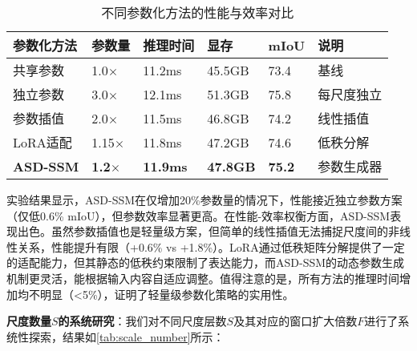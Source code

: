 \documentclass[preprint,12pt]{elsarticle}
\begin{document}
\begin{table}[htbp!]
	\centering
	\caption{不同参数化方法的性能与效率对比}
	\label{tab:parameterization_comparison}
	\begin{tabular}{@{}llllll@{}}
		\toprule
		参数化方法 & 参数量 & 推理时间 & 显存 & mIoU & 说明 \\ 
		\midrule
		共享参数 & 1.0$\times$ & 11.2ms & 45.5GB & 73.4 & 基线 \\
		\midrule
		独立参数 & 3.0$\times$ & 12.1ms & 51.3GB & 75.8 & 每尺度独立 \\
		参数插值 & 2.0$\times$ & 11.5ms & 46.8GB & 74.2 & 线性插值 \\
		LoRA适配 & 1.15$\times$ & 11.8ms & 47.2GB & 74.6 & 低秩分解 \\
		\textbf{ASD-SSM} & \textbf{1.2$\times$} & \textbf{11.9ms} & \textbf{47.8GB} & \textbf{75.2} & 参数生成器 \\
		\bottomrule
	\end{tabular}
\end{table}

实验结果显示，ASD-SSM在仅增加20\%参数量的情况下，性能接近独立参数方案（仅低0.6\% mIoU），但参数效率显著更高。在性能-效率权衡方面，ASD-SSM表现出色。虽然参数插值也是轻量级方案，但简单的线性插值无法捕捉尺度间的非线性关系，性能提升有限（+0.6\% vs +1.8\%）。LoRA通过低秩矩阵分解提供了一定的适配能力，但其静态的低秩约束限制了表达能力，而ASD-SSM的动态参数生成机制更灵活，能根据输入内容自适应调整。值得注意的是，所有方法的推理时间增加均不明显（<5\%），证明了轻量级参数化策略的实用性。

\textbf{尺度数量$S$的系统研究}：我们对不同尺度层数$S$及其对应的窗口扩大倍数$F$进行了系统性探索，结果如\cref{tab:scale_number}所示：
\end{document}
